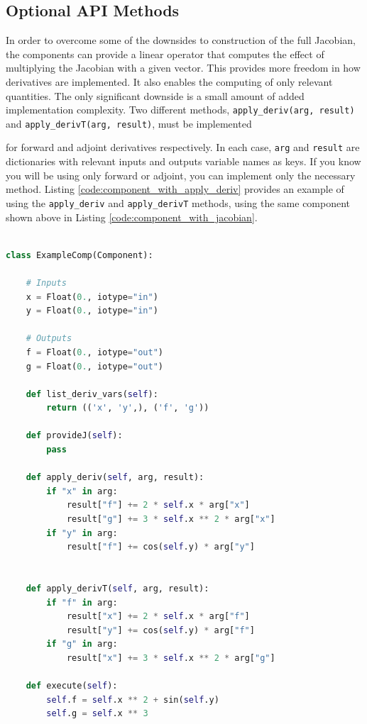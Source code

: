 \documentclass[]{aiaa-tc} %
\begin{document}
    \subsection{Optional API Methods}

        In order to overcome some of the downsides to construction of the full Jacobian, the components can provide
        a linear operator that computes the effect of multiplying the Jacobian with a given vector. This provides
        more freedom in how derivatives are implemented. It also enables the computing of only
        relevant quantities. The only significant downside is a small amount of added implementation complexity.
        Two different methods, \texttt{apply\_deriv(arg, result)} and \texttt{apply\_derivT(arg, result)}, must be implemented

        for forward and adjoint derivatives respectively. In each case, \texttt{arg} and \texttt{result}
        are dictionaries with relevant inputs and outputs variable names as keys.
        If you know you will be using only forward or adjoint, you can implement only the
        necessary method. Listing \ref{code:component_with_apply_deriv} provides an example of
        using the \texttt{apply\_deriv} and \texttt{apply\_derivT} methods, using the same component shown above in
        Listing \ref{code:component_with_jacobian}.

\begin{minipage}{\linewidth}
\begin{lstlisting}[label=code:component_with_apply_deriv,caption=Example OpenMDAO
component with apply\_deriv and apply\_derivT methods implemented,
language=Python , basicstyle=\ttfamily\scriptsize,
           keywordstyle=\color{blue}\ttfamily,
           stringstyle=\color{red}\ttfamily, showstringspaces=false,
           commentstyle=\color{olive}\ttfamily]

class ExampleComp(Component):

    # Inputs
    x = Float(0., iotype="in")
    y = Float(0., iotype="in")

    # Outputs
    f = Float(0., iotype="out")
    g = Float(0., iotype="out")

    def list_deriv_vars(self):
        return (('x', 'y',), ('f', 'g'))

    def provideJ(self):
        pass

    def apply_deriv(self, arg, result):
        if "x" in arg:
            result["f"] += 2 * self.x * arg["x"]
            result["g"] += 3 * self.x ** 2 * arg["x"]
        if "y" in arg:
            result["f"] += cos(self.y) * arg["y"]


    def apply_derivT(self, arg, result):
        if "f" in arg:
            result["x"] += 2 * self.x * arg["f"]
            result["y"] += cos(self.y) * arg["f"]
        if "g" in arg:
            result["x"] += 3 * self.x ** 2 * arg["g"]

    def execute(self):
        self.f = self.x ** 2 + sin(self.y)
        self.g = self.x ** 3

\end{lstlisting}
\end{minipage}
\end{document}
